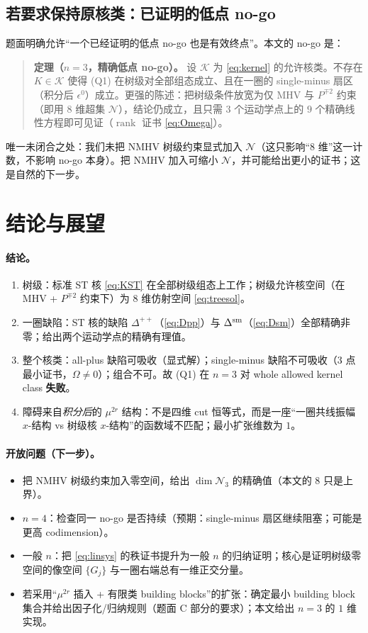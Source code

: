 \documentclass[11pt]{article}
\begin{document}
\subsection{若要求保持原核类：已证明的低点 no-go}
题面明确允许“一个已经证明的低点 no-go 也是有效终点”。本文的 no-go 是：
\begin{quote}
\textbf{定理（$n=3$，精确低点 no-go）。} 设 $\mathcal K$ 为 \eqref{eq:kernel} 的允许核类。不存在 $K\in\mathcal K$ 使得 (Q1) 在树级对全部组态成立、且在一圈的 single-minus 扇区（积分后 $\epsilon^0$）成立。更强的陈述：把树级条件放宽为仅 MHV 与 $P^{\mp2}$ 约束（即用 $8$ 维超集 $\mathcal N$），结论仍成立，且只需 $3$ 个运动学点上的 $9$ 个精确线性方程即可见证（$\operatorname{rank}$ 证书 \eqref{eq:Omega}）。
\end{quote}
唯一未闭合之处：我们未把 NMHV 树级约束显式加入 $\mathcal N$（这只影响“$8$ 维”这一计数，不影响 no-go 本身）。把 NMHV 加入可缩小 $\mathcal N$，并可能给出更小的证书；这是自然的下一步。

\section{结论与展望}
\label{sec:concl}

\paragraph{结论。}
\begin{enumerate}
\item 树级：标准 ST 核 \eqref{eq:KST} 在全部树级组态上工作；树级允许核空间（在 MHV + $P^{\mp2}$ 约束下）为 $8$ 维仿射空间 \eqref{eq:treesol}。
\item 一圈缺陷：ST 核的缺陷 $\Delta^{++}$（\eqref{eq:Dpp}）与 $\Delta^{\rm sm}$（\eqref{eq:Dsm}）全部精确非零；给出两个运动学点的精确有理值。
\item 整个核类：all-plus 缺陷可吸收（显式解）；single-minus 缺陷不可吸收（$3$ 点最小证书，$\Omega\neq0$）；组合不可。故 (Q1) 在 $n=3$ 对 whole allowed kernel class \textbf{失败}。
\item 障碍来自\emph{积分后}的 $\mu^{2r}$ 结构：不是四维 cut 恒等式，而是一座“一圈共线振幅 $x$-结构 vs 树级核 $x$-结构”的函数域不匹配；最小扩张维数为 $1$。
\end{enumerate}

\paragraph{开放问题（下一步）。}
\begin{itemize}
\item 把 NMHV 树级约束加入零空间，给出 $\dim\mathcal N_3$ 的精确值（本文的 $8$ 只是上界）。
\item $n=4$：检查同一 no-go 是否持续（预期：single-minus 扇区继续阻塞；可能是更高 codimension）。
\item 一般 $n$：把 \eqref{eq:linsys} 的秩证书提升为一般 $n$ 的归纳证明；核心是证明树级零空间的像空间 $\{G_j\}$ 与一圈右端总有一维正交分量。
\item 若采用“$\mu^{2r}$ 插入 + 有限类 building blocks”的扩张：确定最小 building block 集合并给出因子化/归纳规则（题面 C 部分的要求）；本文给出 $n=3$ 的 $1$ 维实现。
\end{itemize}
\end{document}
